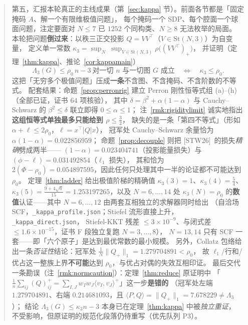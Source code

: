 \documentclass[UTF8,11pt]{ctexart}
\theoremstyle{definition}
\newcommand{\Lam}{\Lambda}
\newcommand{\STW}{\textup{[STW26]}}
\begin{document}
\begin{abstract}
第五，汇报本轮真正的主线成果（第~\ref{sec:kappa} 节）。前面各节都是「固定掩码 $A$、解一个有限维极值问题」，
每个掩码一个 SDP、每个腔面一个球面问题，注定要面对 $N\le7$ 已 $1252$ 个同构类、$N\ge8$ 无法枚举的局面。
本轮把问题\textbf{倒过来}：以秩三正交投影 $Q=VV^\top$（$V\in\mathrm{St}(N,3)$）为自变量，
定义单一常数 $\kappa_3=\sup_{N}\ \sup_{V\in\mathrm{St}(N,3)}\rho\bigl((VV^\top)_+\bigr)$，
并证明（定理~\ref{thm:kappa}、推论~\ref{cor:kappamain}）
\[
\Lam_3(G)\le\rho_0\,n-3\ \text{对一切 }n\text{ 与一切图 }G\text{ 成立}
\quad\Longleftrightarrow\quad \kappa_3\le\rho_0 .
\]
这把「无穷多个极值问题」压成\textbf{一条}不含图、不含掩码、不含阶数的不等式。
配套结果：命题~\ref{prop:perronrig} 建立 Perron 刚性恒等式组 (a)--(h)（全部已证，证书 $64$ 项核验），
其中 $\delta=\beta^2+\alpha(1-\alpha)$ 与 Cauchy--Schwarz 的 $\beta^2\le\delta$ 联立即得 $0\le\alpha\le1$；
注~\ref{rmk:rigiditylimit} 诚实地指出\textbf{这组恒等式单独最多只能给到 $\rho\le\frac32$}，
缺失的是一条「第四不等式」（形如 $\alpha+\ell\le2\rho_0$，$\ell=x^\top|Q|x$），
冠军处 Cauchy--Schwarz 余量恰为 $\alpha(1-\alpha)=0.022856959$；
命题~\ref{prop:decouple} 则把 \STW\ 的损失\emph{精确}劈成两半——
$(1-\alpha)=0.023404741$（投影能量损失）与 $(\phi-\ell)=0.031492854$（$\ell_1$ 损失），
其和恰为 $2(\Phi-\rho_0)=0.054897595$，因此任何只处理其中一半的论证都不可能达到 $\rho_0$。
定理~\ref{thm:ladder} 给出极值阶梯的精确值 $\kappa_3(3)=1$、$\kappa_3(4)=\frac54$、
$\kappa_3(5)=\frac{9+4\sqrt6}{15}=1.253197265$，以及 $N=6,\dots,14$ 处 $\kappa_3(N)=\rho_0$
的\textbf{数值}认证——其中 $N=6,\dots,12$ 由两套互相独立的求解器同时给出
（自洽场 SCF，\texttt{\_kappa\_profile.json}；Stiefel 流形直接上升，\texttt{\_kappa\_direct.json}，
Stiefel-KKT 残差 $\le3\times10^{-9}$、与闭式差 $\le1.6\times10^{-15}$，证书 F 段独立复跑 $N=3,\dots,8$），
$N=13,14$ 只有 SCF 一套——即「六个原子」是达到最优常数的最小规模。
另外，Collatz 包络给出一条\emph{否证性}结论：冠军处 $\frac1N\|Q_+\|_1=1.279704891<\rho_0$，
故 $\ell_1$/行和/优占这一整族上界\textbf{不可能}达到 $\rho_0$，与优占对偶的失效互相印证。
最后交代一条勘误（注~\ref{rmk:normcaution}）：定理~\ref{thm:reduce} 原证明中
「$\frac1n\sum_{ij}(Q)_{ij}^+=\sum_{I,J}w_Iw_J\langle v_I,v_J\rangle^+$」这一步\textbf{是错的}
（冠军处左端 $1.279704891$、右端 $0.214681093$，且 $\langle P,Q\rangle=\|Q_+\|_1=7.678229\ne\Lam_3$）；
结论 $\Lam_3(G)\le\kappa_3n-3$ 本身已在定理~\ref{thm:kappa} 中被\emph{独立重证}，
不受影响，但原证明的规范化段落仍待重写（优先队列 P3）。


\end{abstract}
\end{document}
